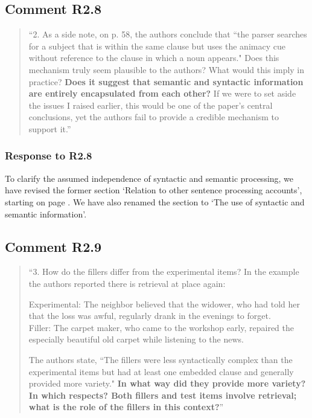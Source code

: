 \documentclass[12pt]{article}
\begin{document}
 
\subsection*{Comment R2.8}
\begin{quote}
``2. As a side note, on p. 58, the authors conclude that ``the parser searches for a subject that is within the same clause but uses the animacy cue without reference to the clause in which a noun appears." Does this mechanism truly seem plausible to the authors? What would this imply in practice? \textbf{Does it suggest that semantic and syntactic information are entirely encapsulated from each other?} If we were to set aside the issues I raised earlier, this would be one of the paper's central conclusions, yet the authors fail to provide a credible mechanism to support it.''
\end{quote}
\subsubsection*{Response to R2.8}

To clarify the assumed independence of syntactic and semantic processing, we have revised the former section `Relation to other sentence processing accounts', starting on page \pageref{synsem}. We have also renamed the section to `The use of syntactic and semantic information'.

\begin{quote}
\end{quote}

 
\subsection*{Comment R2.9}
\begin{quote}
``3. How do the fillers differ from the experimental items? In the example the authors reported there is retrieval at place again:

Experimental: The neighbor believed that the widower, who had told her that the loss was awful, regularly drank in the evenings to forget.\\
Filler: The carpet maker, who came to the workshop early, repaired the especially beautiful old carpet while listening to the news.

The authors state, ``The fillers were less syntactically complex than the experimental items but had at least one embedded clause and generally provided more variety." \textbf{In what way did they provide more variety? In which respects? Both fillers and test items involve retrieval; what is the role of the fillers in this context?}''
\end{quote}
\end{document}

